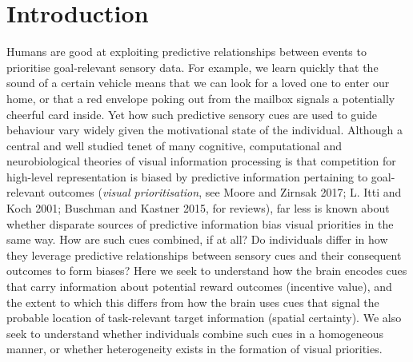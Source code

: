\documentclass[11pt,halfline,a4paper,]{ouparticle}
\begin{document}
\hypertarget{introduction}{%
\section{Introduction}\label{introduction}}

\label{sec:Intro}

Humans are good at exploiting predictive relationships between events to prioritise goal-relevant sensory data. For example, we learn quickly that the sound of a certain vehicle means that we can look for a loved one to enter our home, or that a red envelope poking out from the mailbox signals a potentially cheerful card inside. Yet how such predictive sensory cues are used to guide behaviour vary widely given the motivational state of the individual. Although a central and well studied tenet of many cognitive, computational and neurobiological theories of visual information processing is that competition for high-level representation is biased by predictive information pertaining to goal-relevant outcomes (\emph{visual prioritisation}, see Moore and Zirnsak 2017; L. Itti and Koch 2001; Buschman and Kastner 2015, for reviews), far less is known about whether disparate sources of predictive information bias visual priorities in the same way. How are such cues combined, if at all? Do individuals differ in how they leverage predictive relationships between sensory cues and their consequent outcomes to form biases? Here we seek to understand how the brain encodes cues that carry information about potential reward outcomes (incentive value), and the extent to which this differs from how the brain uses cues that signal the probable location of task-relevant target information (spatial certainty). We also seek to understand whether individuals combine such cues in a homogeneous manner, or whether heterogeneity exists in the formation of visual priorities.
\end{document}
